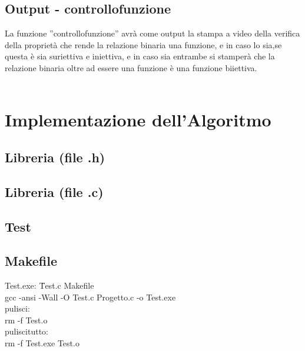 \documentclass[11pt, a4paper, titlepage, block]{article}
\begin{document}
	\subsection{Output - controllo\textunderscore funzione}
	La funzione ”controllo\textunderscore funzione” avr\`a  come output la stampa a video della verifica della propriet\`a  che rende la relazione binaria una funzione, e in caso lo sia,se questa \`e  sia suriettiva e iniettiva, e in caso sia entrambe si stamper\`a  che la relazione binaria oltre ad essere una funzione \`e  una funzione biiettiva.\\
	\\
	\newpage
	\section{Implementazione dell'Algoritmo}
	\subsection{Libreria  (file .h) }
	\lstset{numbers=left, tabsize=2,breaklines=true, language=C}
	 
	\newpage
	\subsection{Libreria  (file .c) }
	\lstset{numbers=left, tabsize=2,breaklines=true, language=C}
	 
	\newpage	
	\subsection{Test}
	\lstset{numbers=left, tabsize=2,breaklines=true, language=C}
	
	\newpage
\subsection{Makefile}
\begin{tabbing}
	Test.exe: \=Test.c Makefile\\
	\>gcc -ansi -Wall -O Test.c Progetto.c -o Test.exe\\
	pulisci:\\
	\>rm -f Test.o\\
	pulisci\textunderscore tutto:\\
	\>rm -f Test.exe Test.o\\
\end{tabbing}
	
	
	
	
	
\end{document}
